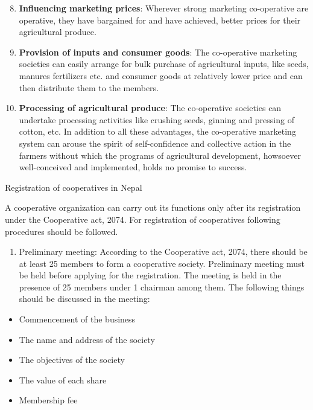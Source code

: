 \documentclass[12pt,ignorenonframetext,aspectratio=169]{beamer}
\providecommand{\tightlist}{%
  \setlength{\itemsep}{0pt}\setlength{\parskip}{0pt}}
\begin{document}
\begin{frame}{}
\protect\hypertarget{section-5}{}
\begin{enumerate}
\setcounter{enumi}{7}
\tightlist
\item
  \textbf{Influencing marketing prices}: Wherever strong marketing
  co-operative are operative, they have bargained for and have achieved,
  better prices for their agricultural produce.
\item
  \textbf{Provision of inputs and consumer goods}: The co-operative
  marketing societies can easily arrange for bulk purchase of
  agricultural inputs, like seeds, manures fertilizers etc. and consumer
  goods at relatively lower price and can then distribute them to the
  members.
\item
  \textbf{Processing of agricultural produce}: The co-operative
  societies can undertake processing activities like crushing seeds,
  ginning and pressing of cotton, etc. In addition to all these
  advantages, the co-operative marketing system can arouse the spirit of
  self-confidence and collective action in the farmers without which the
  programs of agricultural development, howsoever well-conceived and
  implemented, holds no promise to success.
\end{enumerate}
\end{frame}

\begin{frame}{Registration of cooperatives in Nepal}
\protect\hypertarget{registration-of-cooperatives-in-nepal}{}
\footnotesize

A cooperative organization can carry out its functions only after its
registration under the Cooperative act, 2074. For registration of
cooperatives following procedures should be followed.

\begin{enumerate}
\tightlist
\item
  Preliminary meeting: According to the Cooperative act, 2074, there
  should be at least 25 members to form a cooperative society.
  Preliminary meeting must be held before applying for the registration.
  The meeting is held in the presence of 25 members under 1 chairman
  among them. The following things should be discussed in the meeting:
\end{enumerate}

\begin{itemize}
\tightlist
\item
  Commencement of the business
\item
  The name and address of the society
\item
  The objectives of the society
\item
  The value of each share
\item
  Membership fee
\end{itemize}
\end{frame}
\end{document}
